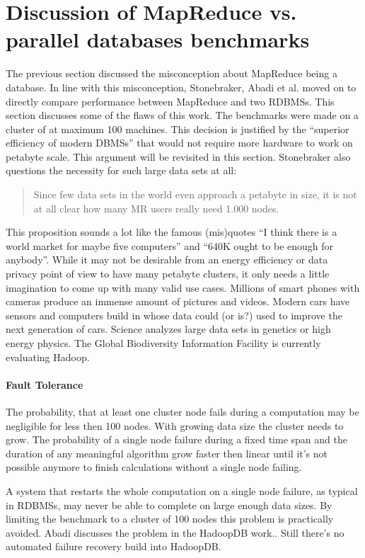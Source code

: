 \documentclass[12pt,a4paper]{scrartcl}		%
\begin{document}
\section{Discussion of MapReduce vs. parallel databases benchmarks}
The previous section discussed the misconception about MapReduce being a database. In line with this misconception, Stonebraker, Abadi et al. moved on to directly compare performance between MapReduce and two RDBMSs.\cite{Pavlo09} This section discusses some of the flaws of this work.
The benchmarks were made on a cluster of at maximum 100 machines. This decision is justified by the ``superior efficiency of modern DBMSs'' that would not require more hardware to work on petabyte scale. This argument will be revisited in this section. 
Stonebraker also questions the necessity for such large data sets at all:
\begin{quote}
  Since few data sets in the world even approach a petabyte in size, it is not at all clear how many MR users really need 1.000 nodes.
\end{quote}
This proposition sounds a lot like the famous (mis)quotes ``I think there is a world market for maybe five computers'' and ``640K ought to be enough for anybody''. While it may not be desirable from an energy efficiency or data privacy point of view to have many petabyte clusters, it only needs a little imagination to come up with many valid use cases. Millions of smart phones with cameras produce an immense amount of pictures and videos. Modern cars have sensors and computers build in whose data could (or is?) used to improve the next generation of cars. Science analyzes large data sets in genetics or high energy physics. The Global Biodiversity Information Facility is currently evaluating Hadoop.

\paragraph{Fault Tolerance}
The probability, that at least one cluster node fails during a computation may be negligible for less then 100 nodes. With growing data size the cluster needs to grow. The probability of a single node failure during a fixed time span and the duration of any meaningful algorithm grow faster then linear until it's not possible anymore to finish calculations without a single node failing.

A system that restarts the whole computation on a single node failure, as typical in RDBMSs, may never be able to complete on large enough data sizes.
By limiting the benchmark to a cluster of 100 nodes this problem is practically avoided. Abadi discusses the problem in the HadoopDB work.\cite{journals/pvldb/AbouzeidBARS09}. Still there's no automated failure recovery build into HadoopDB.
\end{document}
